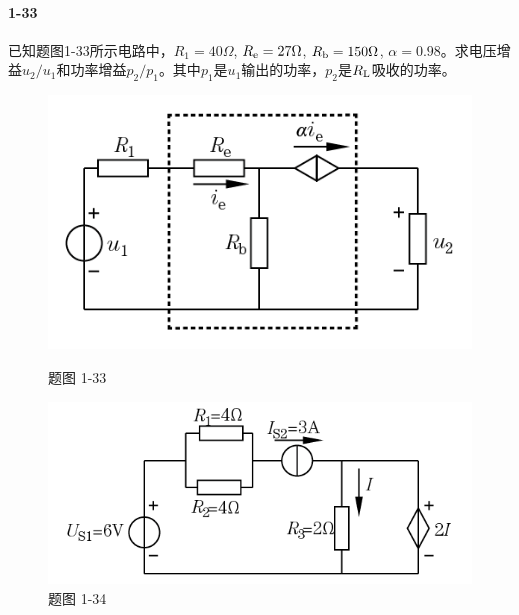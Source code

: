 \documentclass[hyperref, UTF8]{ctexart}
\begin{document}
\paragraph{1-33}\label{1-33}
已知题图1-33所示电路中，$R_1=40\Omega$, $R_{\rm e}=27\Omega$, $R_{\rm b}=150\Omega$, $\alpha=0.98$。求电压增益$u_2/u_1$和功率增益$p_2/p_1$。其中$p_1$是$u_1$输出的功率，$p_2$是$R_{\rm L}$吸收的功率。

\begin{figure}[!htb]
  \centering
  \begin{minipage}[t]{0.328\textwidth}
    \centering
    \includegraphics[width=1\textwidth]{p1-33.png}
    \caption*{题图 1-33}
  \end{minipage}
  \begin{minipage}[t]{0.379\textwidth}
    \centering
    \includegraphics[width=1\textwidth]{p1-34.png}
    \caption*{题图 1-34}
  \end{minipage}
\end{figure}
\end{document}
